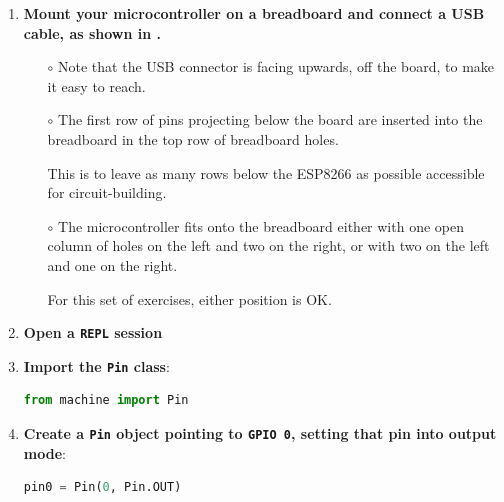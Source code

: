 \begin{enumerate}
	\item \textbf{Mount your microcontroller on a breadboard and connect a USB cable, as shown in .}

	\begin{itemize}
		\item[$\circ$] Note that the USB connector is facing upwards, off the board, to make it easy to reach.
		\item[$\circ$] The first row of pins projecting below the board are inserted into the breadboard in the top row of breadboard holes.

		This is to leave as many rows below the ESP8266 as possible accessible for circuit-building.

		\item[$\circ$] The microcontroller fits onto the breadboard either with one open column of holes on the left and two on the right, or with two on the left and one on the right.

		\smallskip
		For this set of exercises, either position is OK.
	\end{itemize}

	\item \textbf{Open a \texttt{REPL} session}

	\item \textbf{Import the \texttt{Pin} class}:%
\begin{lstlisting}[language=Python]
from machine import Pin
\end{lstlisting}

	\item \textbf{Create a \texttt{Pin} object pointing to \texttt{GPIO 0}, setting that pin into output mode}:
\begin{lstlisting}[language=Python]
pin0 = Pin(0, Pin.OUT)
\end{lstlisting}


\end{enumerate}
